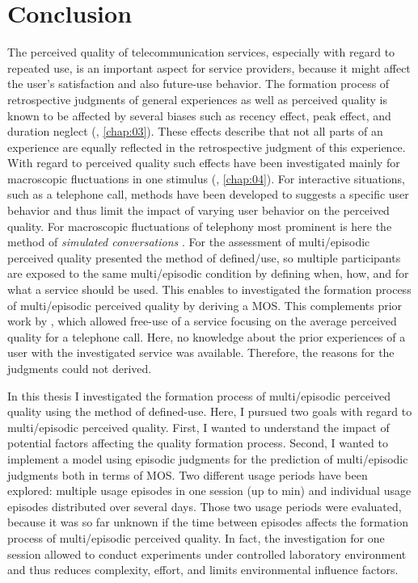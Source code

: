 \chapter{Conclusion}\label{chap:discussion}
The perceived quality of telecommunication services, especially with regard to repeated use, is an important aspect for service providers, because it might affect the user's satisfaction and also future-use behavior.
The formation process of retrospective judgments of general experiences as well as perceived quality is known to be affected by several biases such as recency effect, peak effect, and duration neglect (\cf, \autoref{chap:03}).
These effects describe that not all parts of an experience are equally reflected in the retrospective judgment of this experience.
With regard to perceived quality such effects have been investigated mainly for macroscopic fluctuations in one stimulus (\cf, \autoref{chap:04}).
For interactive situations, such as a telephone call, methods have been developed to suggests a specific user behavior and thus limit the impact of varying user behavior on the perceived quality.
For macroscopic fluctuations of telephony most prominent is here the method of \emph{simulated conversations} \citep{weiss_modeling_2009}.
For the assessment of multi\-/episodic perceived quality \citet{moller_single-call_2011} presented the method of defined\-/use, so multiple participants are exposed to the same multi\-/episodic condition by defining when, how, and for what a service should be used.
This enables to investigated the formation process of multi\-/episodic perceived quality by deriving a \ac{MOS}.
This complements prior work by \citet{duncanson_average_1969}, which allowed free-use of a service focusing on the average perceived quality for a telephone call.
Here, no knowledge about the prior experiences of a user with the investigated service was available.
Therefore, the reasons for the judgments could not derived.

In this thesis I investigated the formation process of multi\-/episodic perceived quality using the method of defined-use.
Here, I pursued two goals with regard to multi\-/episodic perceived quality.
First, I wanted to understand the impact of potential factors affecting the quality formation process.
Second, I wanted to implement a model using episodic judgments for the prediction of multi\-/episodic judgments both in terms of \ac{MOS}.
Two different usage periods have been explored: multiple usage episodes in one session (up to \unit[45]{min}) and individual usage episodes distributed over several days.
Those two usage periods were evaluated, because it was so far unknown if the time between episodes affects the formation process of multi\-/episodic perceived quality.
In fact, the investigation for one session allowed to conduct experiments under controlled laboratory environment and thus reduces complexity, effort, and limits environmental influence factors.

